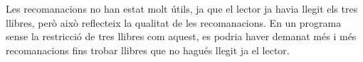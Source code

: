 Les recomanacions no han estat molt útils, ja que el lector ja havia llegit els tres llibres, però això reflecteix la qualitat de les recomanacions. En un programa sense la restricció de tres llibres com aquest, es podria haver demanat més i més recomanacions fins trobar llibres que no hagués llegit ja el lector.
